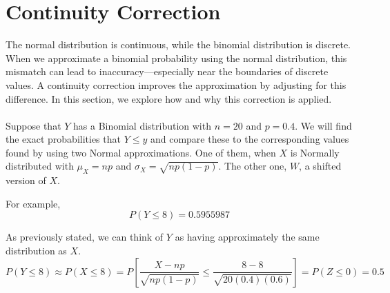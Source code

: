 \section{Continuity Correction}
The normal distribution is continuous, while the binomial distribution is discrete. When we approximate a binomial probability using the normal distribution, this mismatch can lead to inaccuracy—especially near the boundaries of discrete values. A continuity correction improves the approximation by adjusting for this difference. In this section, we explore how and why this correction is applied. \\
\vspace{0.5em} \\
Suppose that $Y$ has a Binomial distribution with $n = 20$ and $p = 0.4$. We will find the exact probabilities that $Y \leq y$ and compare these to the corresponding values found by using two Normal approximations. One of them, when $X$ is Normally distributed with $\mu_X = np$ and $\sigma_X = \sqrt{np(1 - p)}$.
\vspace{1em}
The other one, $W$, a shifted version of $X$.

\vspace{1em}

For example,
\[
P(Y \leq 8) = 0.5955987
\]

As previously stated, we can think of $Y$ as having approximately the same distribution as $X$.
\[
P(Y \leq 8) \approx P(X \leq 8)
= P\left[ \frac{X - np}{\sqrt{np(1 - p)}} \leq \frac{8 - 8}{\sqrt{20(0.4)(0.6)}} \right]
= P(Z \leq 0) = 0.5
\]

\vspace{1em}

